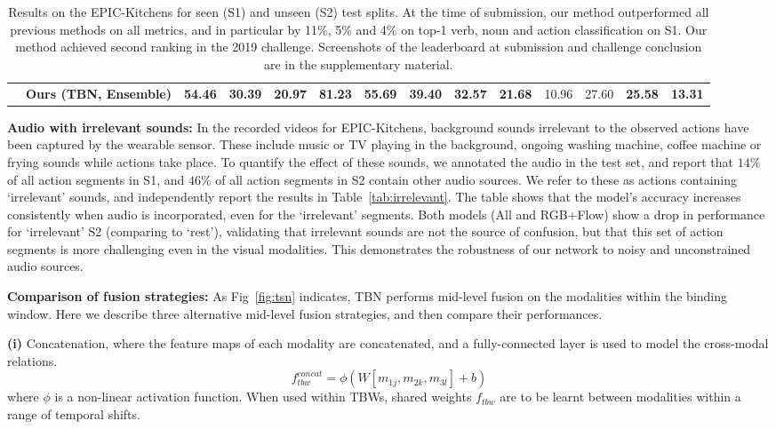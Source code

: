 \documentclass[10pt,twocolumn,letterpaper]{article}
\begin{document}
\begin{table*}[t]
\begin{center}
{\begin{tabular}{ll|ccc|ccc|ccc|ccc}
                        & \textbf{Ours (TBN, Ensemble)} & \textbf{54.46} & \textbf{30.39} & \textbf{20.97} & \textbf{81.23} & \textbf{55.69} & \textbf{39.40} & \textbf{32.57} & \textbf{21.68} & 10.96 & 27.60 & \textbf{25.58} & \textbf{13.31}\\

\end{tabular}}
\caption{Results on the EPIC-Kitchens for seen (S1) and unseen (S2) test splits. At the time of submission, our method outperformed all previous methods on all metrics, and in particular by 11\%, 5\% and 4\% on top-1 verb, noun and action classification on S1. Our method achieved second ranking in the 2019 challenge. Screenshots of the leaderboard at submission and challenge conclusion are in the supplementary material.}
\label{tab:resultsF}
\end{center}
\end{table*}

 
\noindent \textbf{Audio with irrelevant sounds:} In the recorded videos for EPIC-Kitchens, background sounds irrelevant to the observed actions have been captured by the wearable sensor.
These include music or TV playing in the background, ongoing washing machine, coffee machine or frying sounds while actions take place. 
To quantify the effect of these sounds, we annotated the audio in the test set, and report that $14\%$ of all action segments in S1, and $46\%$ of all action segments in S2 contain other audio sources. We refer to these as actions containing `irrelevant' sounds, and independently report the results in Table~\ref{tab:irrelevant}. 
The table shows that the model's accuracy increases consistently when audio is incorporated, even for the `irrelevant' segments.
Both models (All and RGB+Flow) show a drop in performance for `irrelevant' S2 (comparing to `rest'), validating that irrelevant sounds are not the source of confusion, but that this set of action segments is more challenging even in the visual modalities.
This demonstrates the robustness of our network to noisy and unconstrained audio sources.



\noindent\textbf{Comparison of fusion strategies: }As Fig~\ref{fig:tsn} indicates, TBN performs mid-level fusion on the modalities within the binding window.
Here we describe three alternative mid-level fusion strategies, and then compare their performances.

\noindent \textbf{(i)} {Concatenation}, where the feature maps of each modality are concatenated, and a fully-connected layer is used to model the cross-modal relations.
\begin{equation}
\label{eq:concat}
    f_{tbw}^{concat} = \phi(W[m_{1j},m_{2k},m_{3l}] + b)
\end{equation}
where $\phi$ is a non-linear activation function.  When used within TBWs, shared weights $f_{tbw}$ are to be learnt between modalities within a range of temporal shifts.
\end{document}
